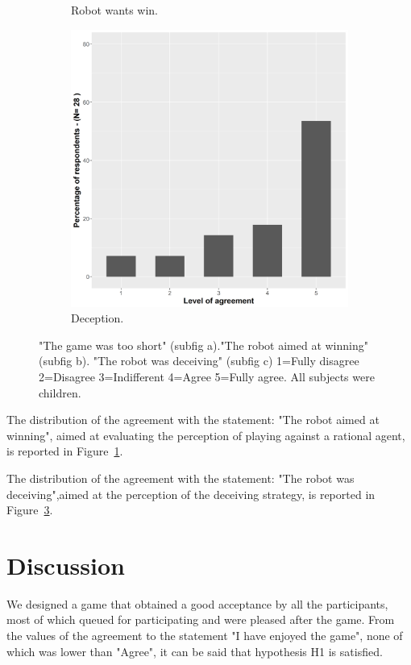 \begin{figure}[tbp]
\begin{subfigure}[t]{0.49\columnwidth}
    \caption{Robot wants win.}
    \label{fig::dynamicWinYoung}
  \end{subfigure}
    \hspace{0.01\columnwidth}
  \begin{subfigure}[t]{0.49\columnwidth}
  \centering
    \includegraphics[width=\linewidth]{images/06-deception/dynamicWinYoung}
   \caption{Deception.}
    \label{fig::dynamicDeceiveYoung}
  \end{subfigure}
  \caption{"The game was too short" (subfig a)."The robot aimed at winning" (subfig b). "The robot was deceiving" (subfig c) 1=Fully disagree 2=Disagree 3=Indifferent 4=Agree 5=Fully agree. All subjects were children.}
\end{figure}

The distribution of the agreement with the statement: "The robot aimed at winning", aimed at evaluating the perception of playing against a rational agent, is reported in Figure~\ref{fig::dynamicWinYoung}.

The distribution of the agreement with the statement: "The robot was deceiving",aimed at the perception of the deceiving strategy, is reported in Figure~\ref{fig::dynamicDeceiveYoung}.

\section{Discussion}
\label{S:Discussion}
We designed a game that obtained a good acceptance by all the participants, most of which queued for participating and were pleased after the game. From the values of the agreement to the statement "I have enjoyed the game", none of which was lower than "Agree", it can be said that hypothesis H1 is satisfied.  

